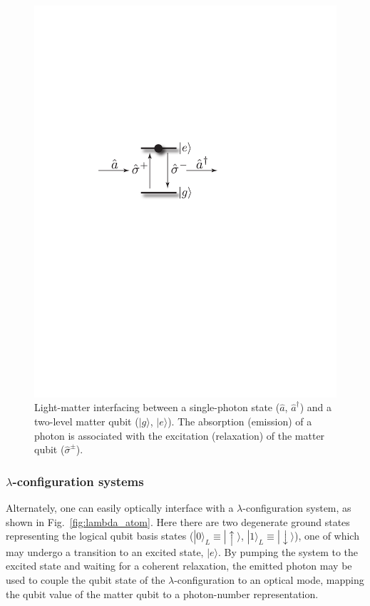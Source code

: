 \documentclass[aps,rmp,twocolumn,amsmath,amssymb,nofootinbib,superscriptaddress,longbibliography,floatfix,table-of-contents,eqsecnum]{revtex4-1}
\newcommand{\ket}[1]{|#1\rangle}
\begin{document}
\begin{figure}[!htb]
\includegraphics[width=0.6\columnwidth]{opt_inter}
\caption{Light-matter interfacing between a single-photon state ($\hat{a}$, $\hat{a}^\dag$) and a two-level matter qubit ($\ket{g}$, $\ket{e}$). The absorption (emission) of a photon is associated with the excitation (relaxation) of the matter qubit ($\hat\sigma^\pm$).} \label{fig:opt_int}
\end{figure}

%
%

\subsubsection{$\lambda$-configuration systems} 

Alternately, one can easily optically interface with a $\lambda$-configuration system, as shown in Fig.~\ref{fig:lambda_atom}. Here there are two degenerate ground states representing the logical qubit basis states (\mbox{$\ket{0}_L\equiv\ket{\!\uparrow}$}, \mbox{$\ket{1}_L\equiv\ket{\!\downarrow}$}), one of which may undergo a transition to an excited state, $\ket{e}$. By pumping the system to the excited state and waiting for a coherent relaxation, the emitted photon may be used to couple the qubit state of the $\lambda$-configuration to an optical mode, mapping the qubit value of the matter qubit to a photon-number representation.
\end{document}
